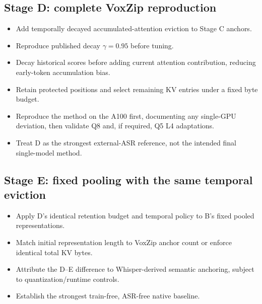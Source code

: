 \documentclass[10pt,letterpaper]{article}
\begin{document}
\subsection{Stage D: complete VoxZip reproduction}
\begin{itemize}
    \item Add temporally decayed accumulated-attention eviction to Stage C anchors.
    \item Reproduce published decay $\gamma=0.95$ before tuning.
    \item Decay historical scores before adding current attention contribution, reducing early-token accumulation bias.
    \item Retain protected positions and select remaining KV entries under a fixed byte budget.
    \item Reproduce the method on the A100 first, documenting any single-GPU deviation, then validate Q8 and, if required, Q5 L4 adaptations.
    \item Treat D as the strongest external-ASR reference, not the intended final single-model method.
\end{itemize}

\subsection{Stage E: fixed pooling with the same temporal eviction}
\begin{itemize}
    \item Apply D's identical retention budget and temporal policy to B's fixed pooled representations.
    \item Match initial representation length to VoxZip anchor count or enforce identical total KV bytes.
    \item Attribute the D--E difference to Whisper-derived semantic anchoring, subject to quantization/runtime controls.
    \item Establish the strongest train-free, ASR-free native baseline.
\end{itemize}
\end{document}
